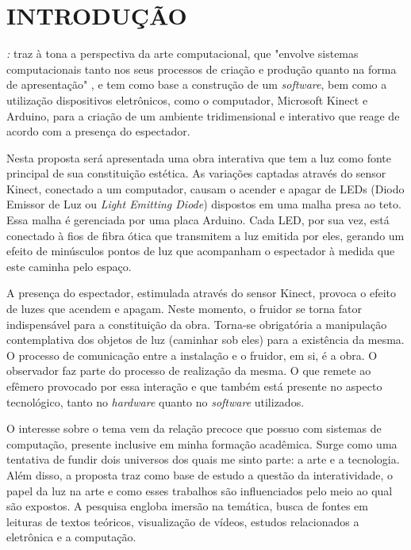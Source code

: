 %
%

\chapter{INTRODUÇÃO}\label{chap:introducao}

\textit{{\imprimirtitulotb}: {\imprimirsubtitulo}} traz à tona a perspectiva da arte computacional, que "envolve sistemas computacionais tanto nos seus processos de criação e produção quanto na forma de apresentação" \cite[p. 36]{boone}, e tem como base a construção de um \textit{software}, bem como a utilização dispositivos eletrônicos, como o computador, Microsoft Kinect e Arduino, para a criação de um ambiente tridimensional e interativo que reage de acordo com a presença do espectador.

Nesta proposta será apresentada uma obra interativa que tem a luz como fonte principal de sua constituição estética. As variações captadas através do sensor Kinect, conectado a um computador, causam o acender e apagar de LEDs (Diodo Emissor de Luz ou \textit{Light Emitting Diode}) dispostos em uma malha presa ao teto. Essa malha é gerenciada por uma placa Arduino. Cada LED, por sua vez, está conectado à fios de fibra ótica que transmitem a luz emitida por eles, gerando um efeito de minúsculos pontos de luz que acompanham o espectador à medida que este caminha pelo espaço.

A presença do espectador, estimulada através do sensor Kinect, provoca o efeito de luzes que acendem e apagam. Neste momento, o fruidor se torna fator indispensável para a constituição da obra. Torna-se obrigatória a manipulação contemplativa dos objetos de luz  (caminhar sob eles) para a existência da mesma. O processo de comunicação entre a instalação e o fruidor, em si, é a obra. O observador faz parte do processo de realização da mesma. O que remete ao efêmero provocado por essa interação e que também está presente no aspecto tecnológico, tanto no \textit{hardware} quanto no \textit{software} utilizados. 

O interesse sobre o tema vem da relação precoce que possuo com sistemas de computação, presente inclusive em minha formação acadêmica. Surge como uma tentativa de fundir dois universos dos quais me sinto parte: a arte e a tecnologia. Além disso, a proposta traz como base de estudo a questão da interatividade, o papel da luz na arte e como esses trabalhos são influenciados pelo meio ao qual são expostos. A pesquisa engloba imersão na temática, busca de fontes em leituras de textos teóricos, visualização de vídeos, estudos relacionados a eletrônica e a computação.
